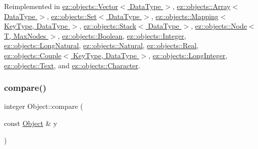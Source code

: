 Reimplemented in \hyperlink{classez_1_1objects_1_1Vector_adc6a4145747c6dfa104cd68d3ced3d35}{ez\+::objects\+::\+Vector$<$ Data\+Type $>$}, \hyperlink{classez_1_1objects_1_1Array_a8618e73b6309573691b1fea690b8213a}{ez\+::objects\+::\+Array$<$ Data\+Type $>$}, \hyperlink{classez_1_1objects_1_1Set_a1faa8b09dc50d82e203d3e31f3b9f33e}{ez\+::objects\+::\+Set$<$ Data\+Type $>$}, \hyperlink{classez_1_1objects_1_1Mapping_aa8eb01c13630ff6ab44438e9a25aa019}{ez\+::objects\+::\+Mapping$<$ Key\+Type, Data\+Type $>$}, \hyperlink{classez_1_1objects_1_1Stack_a350a12fecda720df715bf1d773e1a696}{ez\+::objects\+::\+Stack$<$ Data\+Type $>$}, \hyperlink{classez_1_1objects_1_1Node_ae2876fa89991bf6593f54e015f22a156}{ez\+::objects\+::\+Node$<$ T, Max\+Nodes $>$}, \hyperlink{classez_1_1objects_1_1Boolean_a3b1b1775d4869ba005cf4d20623d1260}{ez\+::objects\+::\+Boolean}, \hyperlink{classez_1_1objects_1_1Integer_a83913903bdcb955ae11a08d12d9e26c6}{ez\+::objects\+::\+Integer}, \hyperlink{classez_1_1objects_1_1LongNatural_a328f33f3435bae79bbb3e9b0dcb8a3a7}{ez\+::objects\+::\+Long\+Natural}, \hyperlink{classez_1_1objects_1_1Natural_a9f94e66e21ccc25b091cc87f4879af21}{ez\+::objects\+::\+Natural}, \hyperlink{classez_1_1objects_1_1Real_a709e5a1bf422673b1b27d4d9d58de4b5}{ez\+::objects\+::\+Real}, \hyperlink{classez_1_1objects_1_1Couple_ad258aa010ee9a4bfdecb715de7d93116}{ez\+::objects\+::\+Couple$<$ Key\+Type, Data\+Type $>$}, \hyperlink{classez_1_1objects_1_1LongInteger_af19a10913ba906a81cdb164897edade6}{ez\+::objects\+::\+Long\+Integer}, \hyperlink{classez_1_1objects_1_1Text_a800bc02ede66fad6e7f95042012a918e}{ez\+::objects\+::\+Text}, and \hyperlink{classez_1_1objects_1_1Character_ad272c9b94a2d152f0832f2957cfd4e63}{ez\+::objects\+::\+Character}.

\mbox{\label{classez_1_1objects_1_1Object_aca311d389dffa204e425463145f4e1e6}} 
\subsubsection{\texorpdfstring{compare()}{compare()}}
{\footnotesize\ttfamily integer Object\+::compare (\begin{DoxyParamCaption}\item[{const \hyperlink{classez_1_1objects_1_1Object}{Object} \&}]{y }\end{DoxyParamCaption})\hspace{0.3cm}{\ttfamily [virtual]}}

